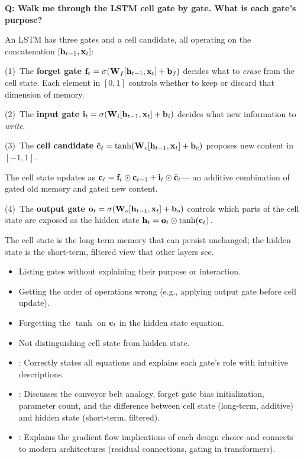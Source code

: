 \begin{interviewq}
\textbf{Q: Walk me through the LSTM cell gate by gate. What is each
gate's purpose?}

 \quad {} \quad
\badgefreq{\freqhigh}

\stronganswer
An LSTM has three gates and a cell candidate, all operating on the
concatenation $[\mathbf{h}_{t-1}, \mathbf{x}_t]$:

(1)~The \textbf{forget gate} $\mathbf{f}_t = \sigma(\mathbf{W}_f [\mathbf{h}_{t-1},
\mathbf{x}_t] + \mathbf{b}_f)$ decides what to \emph{erase} from the cell state.
Each element in $[0,1]$ controls whether to keep or discard that
dimension of memory.

(2)~The \textbf{input gate} $\mathbf{i}_t = \sigma(\mathbf{W}_i [\mathbf{h}_{t-1},
\mathbf{x}_t] + \mathbf{b}_i)$ decides what new information to \emph{write}.

(3)~The \textbf{cell candidate} $\tilde{\mathbf{c}}_t = \tanh(\mathbf{W}_c [\mathbf{h}_{t-1},
\mathbf{x}_t] + \mathbf{b}_c)$ proposes new content in $[-1, 1]$.

The cell state updates as
$\mathbf{c}_t = \mathbf{f}_t \odot \mathbf{c}_{t-1} + \mathbf{i}_t \odot \tilde{\mathbf{c}}_t$---
an additive combination of gated old memory and gated new content.

(4)~The \textbf{output gate} $\mathbf{o}_t = \sigma(\mathbf{W}_o [\mathbf{h}_{t-1},
\mathbf{x}_t] + \mathbf{b}_o)$ controls which parts of the cell state are exposed as
the hidden state $\mathbf{h}_t = \mathbf{o}_t \odot \tanh(\mathbf{c}_t)$.

The cell state is the long-term memory that can persist unchanged; the
hidden state is the short-term, filtered view that other layers see.

\redflags
\begin{itemize}
\item Listing gates without explaining their purpose or interaction.
\item Getting the order of operations wrong (e.g., applying output gate
  before cell update).
\item Forgetting the $\tanh$ on $\mathbf{c}_t$ in the hidden state equation.
\item Not distinguishing cell state from hidden state.
\end{itemize}


\goodgreat
\begin{itemize}
\item {}: Correctly states all equations and explains each
  gate's role with intuitive descriptions.
\item {}: Discusses the conveyor belt analogy, forget gate
  bias initialization, parameter count, and the difference between cell
  state (long-term, additive) and hidden state (short-term, filtered).
\item {}: Explains the gradient flow implications of each
  design choice and connects to modern architectures (residual
  connections, gating in transformers).
\end{itemize}


\end{interviewq}
